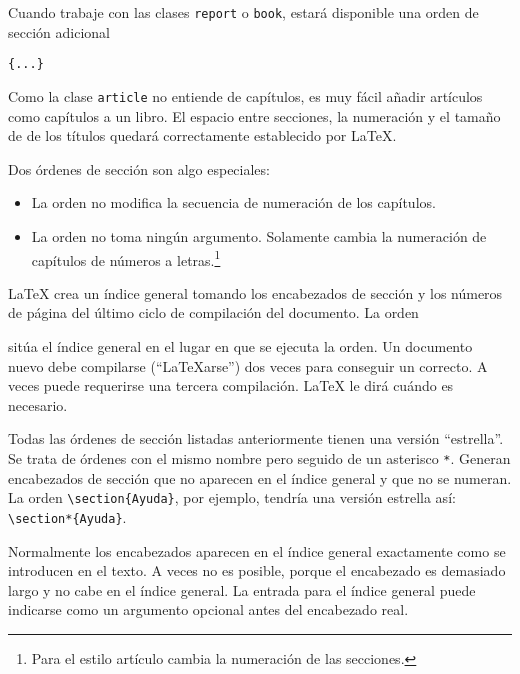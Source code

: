 Cuando trabaje con las clases \texttt{report} o \texttt{book}, estará disponible una orden de sección adicional
\begin{lscommand}
\verb|{...}|
\end{lscommand}

Como la clase \texttt{article} no entiende de capítulos, es muy fácil añadir artículos como capítulos a un libro.  El espacio entre secciones, la numeración y el tamaño de \fontnomo{} de los títulos quedará correctamente establecido por \LaTeX.

Dos órdenes de sección son algo especiales:
\begin{itemize}
    \item La orden  no modifica la secuencia de numeración de los  capítulos.
    \item La orden  no toma ningún argumento.  Solamente cambia la numeración de capítulos de números a letras.\footnote{Para el estilo artículo cambia la numeración de las secciones.}
\end{itemize}

\LaTeX{} crea un índice general tomando los encabezados de sección y los números de página del último ciclo de compilación del documento.  La orden
\begin{lscommand} 
\end{lscommand} 
sitúa el índice general en el lugar en que se ejecuta la orden.  Un documento nuevo debe compilarse (``\LaTeX arse'') dos veces para conseguir un  correcto.  A veces puede requerirse una tercera compilación.  \LaTeX{} le dirá cuándo es necesario.

Todas las órdenes de sección listadas anteriormente tienen una versión ``estrella''.  Se trata de órdenes con el mismo nombre pero seguido de un asterisco \verb|*|.  Generan encabezados de sección que no aparecen en el índice general y que no se numeran.  La orden \verb|\section{Ayuda}|, por ejemplo, tendría una versión estrella así: \verb|\section*{Ayuda}|.

Normalmente los encabezados aparecen en el índice general exactamente como se introducen en el texto.  A veces no es posible, porque el encabezado es demasiado largo y no cabe en el índice general.  La entrada para el índice general puede indicarse como un argumento opcional antes del encabezado real.

